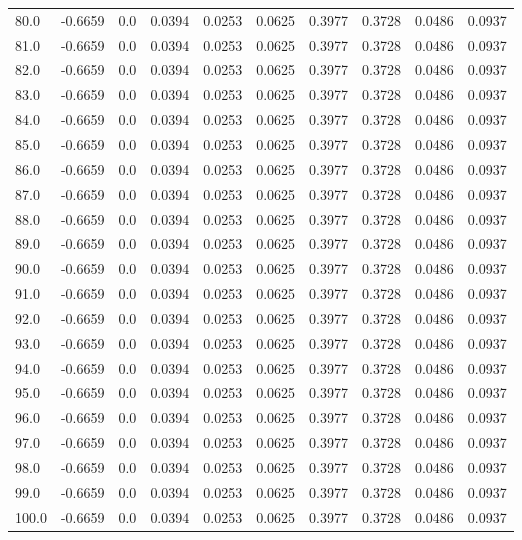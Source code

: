 \begin{longtable}{lrrrrrrrrr}
80.0 & -0.6659 & 0.0 & 0.0394 & 0.0253 & 0.0625 & 0.3977 & 0.3728 & 0.0486 & 0.0937 \\
81.0 & -0.6659 & 0.0 & 0.0394 & 0.0253 & 0.0625 & 0.3977 & 0.3728 & 0.0486 & 0.0937 \\
82.0 & -0.6659 & 0.0 & 0.0394 & 0.0253 & 0.0625 & 0.3977 & 0.3728 & 0.0486 & 0.0937 \\
83.0 & -0.6659 & 0.0 & 0.0394 & 0.0253 & 0.0625 & 0.3977 & 0.3728 & 0.0486 & 0.0937 \\
84.0 & -0.6659 & 0.0 & 0.0394 & 0.0253 & 0.0625 & 0.3977 & 0.3728 & 0.0486 & 0.0937 \\
85.0 & -0.6659 & 0.0 & 0.0394 & 0.0253 & 0.0625 & 0.3977 & 0.3728 & 0.0486 & 0.0937 \\
86.0 & -0.6659 & 0.0 & 0.0394 & 0.0253 & 0.0625 & 0.3977 & 0.3728 & 0.0486 & 0.0937 \\
87.0 & -0.6659 & 0.0 & 0.0394 & 0.0253 & 0.0625 & 0.3977 & 0.3728 & 0.0486 & 0.0937 \\
88.0 & -0.6659 & 0.0 & 0.0394 & 0.0253 & 0.0625 & 0.3977 & 0.3728 & 0.0486 & 0.0937 \\
89.0 & -0.6659 & 0.0 & 0.0394 & 0.0253 & 0.0625 & 0.3977 & 0.3728 & 0.0486 & 0.0937 \\
90.0 & -0.6659 & 0.0 & 0.0394 & 0.0253 & 0.0625 & 0.3977 & 0.3728 & 0.0486 & 0.0937 \\
91.0 & -0.6659 & 0.0 & 0.0394 & 0.0253 & 0.0625 & 0.3977 & 0.3728 & 0.0486 & 0.0937 \\
92.0 & -0.6659 & 0.0 & 0.0394 & 0.0253 & 0.0625 & 0.3977 & 0.3728 & 0.0486 & 0.0937 \\
93.0 & -0.6659 & 0.0 & 0.0394 & 0.0253 & 0.0625 & 0.3977 & 0.3728 & 0.0486 & 0.0937 \\
94.0 & -0.6659 & 0.0 & 0.0394 & 0.0253 & 0.0625 & 0.3977 & 0.3728 & 0.0486 & 0.0937 \\
95.0 & -0.6659 & 0.0 & 0.0394 & 0.0253 & 0.0625 & 0.3977 & 0.3728 & 0.0486 & 0.0937 \\
96.0 & -0.6659 & 0.0 & 0.0394 & 0.0253 & 0.0625 & 0.3977 & 0.3728 & 0.0486 & 0.0937 \\
97.0 & -0.6659 & 0.0 & 0.0394 & 0.0253 & 0.0625 & 0.3977 & 0.3728 & 0.0486 & 0.0937 \\
98.0 & -0.6659 & 0.0 & 0.0394 & 0.0253 & 0.0625 & 0.3977 & 0.3728 & 0.0486 & 0.0937 \\
99.0 & -0.6659 & 0.0 & 0.0394 & 0.0253 & 0.0625 & 0.3977 & 0.3728 & 0.0486 & 0.0937 \\
100.0 & -0.6659 & 0.0 & 0.0394 & 0.0253 & 0.0625 & 0.3977 & 0.3728 & 0.0486 & 0.0937 \\

\end{longtable}
